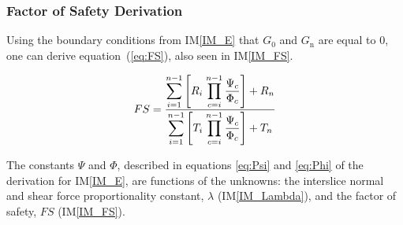 \documentclass[12pt]{article}
\newcommand{\iref}[1]{IM\ref{#1}}
\begin{document}
\subsubsection*{Factor of Safety Derivation}

\noindent
Using the boundary conditions from \iref{IM_E} that $G_{\text{0}}$ and 
$G_{\text{n}}$ are equal to $0$, one can derive equation~(\ref{eq:FS}),
also seen in \iref{IM_FS}.

\begin{equation}\label{eq:FS}
 {FS}= \frac{\displaystyle\sum_{i=1}^{n-1} \left[ {R_{i}}
 	\;{\displaystyle\prod_{c=i}^{n-1} \frac{\Psi_{c}}{\Phi_{c}}
 	}\right] + {R_{n}} }{\displaystyle\sum_{i=1}^{n-1} \left[ {T_{i}}
 	\;{\displaystyle\prod_{c=i}^{n-1} \frac{\Psi_{c}}{\Phi_{c}}
 	}\right] + {T_{n}} }\\
\end{equation}

\noindent
The constants $\Psi$ and $\Phi$, described in equations \ref{eq:Psi}
and \ref{eq:Phi} of the derivation for \iref{IM_E}, are functions of the 
unknowns: the interslice normal and shear force proportionality constant, 
$\lambda$ 
(\iref{IM_Lambda}), and the factor of safety, $FS$ (\iref{IM_FS}).

~\newline

\end{document}
